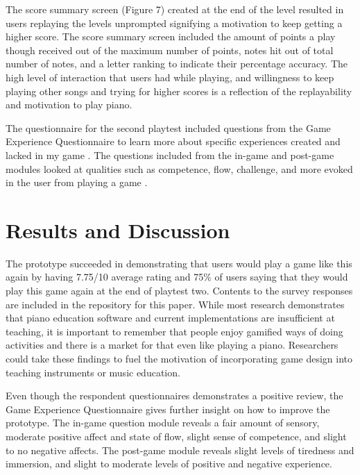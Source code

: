 \documentclass[10pt,twocolumn]{article}
\begin{document}
The score summary screen (Figure 7) created at the end of the level resulted in users replaying the levels unprompted signifying a motivation to keep getting a higher score. The score summary screen included the amount of points a play though received out of the maximum number of points, notes hit out of total number of notes, and a letter ranking to indicate their percentage accuracy. The high level of interaction that users had while playing, and willingness to keep playing other songs and trying for higher scores is a reflection of the replayability and motivation to play piano. 

The questionnaire for the second playtest included questions from the Game Experience Questionnaire to learn more about specific experiences created and lacked in my game \cite{GEQpaper}. The questions included from the in-game and post-game modules looked at qualities such as competence, flow, challenge, and more evoked in the user from playing a game \cite{GEQquestions}. 


\section{Results and Discussion}

The prototype succeeded in demonstrating that users would play a game like this again by having 7.75/10 average rating and 75\% of users saying that they would play this game again at the end of playtest two. Contents to the survey responses are included in the repository for this paper. While most research demonstrates that piano education software and current implementations are insufficient at teaching, it is important to remember that people enjoy gamified ways of doing activities and there is a market for that even like playing a piano. Researchers could take these findings to fuel the motivation of incorporating game design into teaching instruments or music education. 

Even though the respondent questionnaires demonstrates a positive review, the Game Experience Questionnaire gives further insight on how to improve the prototype. The in-game question module reveals a fair amount of sensory, moderate positive affect and state of flow, slight sense of competence, and slight to no negative affects. The post-game module reveals slight levels of tiredness and immersion, and slight to moderate levels of positive and negative experience. 
\end{document}
